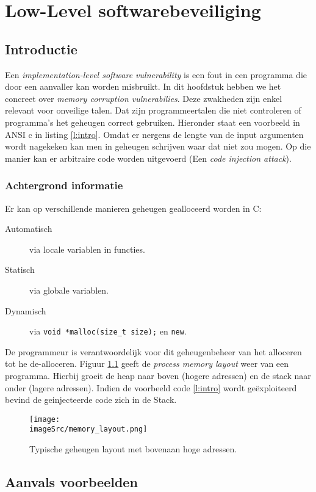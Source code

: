 \documentclass[../main.tex]{subfiles}
\begin{document}
\chapter{Low-Level softwarebeveiliging}
\section{Introductie}
Een \emph{implementation-level software vulnerability} is een fout in een programma die door een aanvaller kan worden misbruikt.
In dit hoofdstuk hebben we het concreet over \emph{memory corruption vulnerabilies}.
Deze zwakheden zijn enkel relevant voor onveilige talen.
Dat zijn programmeertalen die niet controleren of programma's het geheugen correct gebruiken.
Hieronder staat een voorbeeld in ANSI c in listing \ref{l:intro}. Omdat er nergens de lengte van de input argumenten wordt nagekeken kan men in geheugen schrijven waar dat niet zou mogen.
Op die manier kan er arbitraire code worden uitgevoerd (Een \emph{code injection attack}).
 


\subsection{Achtergrond informatie}
Er kan op verschillende manieren geheugen gealloceerd worden in C:
\begin{description}
	\item[Automatisch] via locale variablen in functies.	
	\item[Statisch] via globale variablen.	
	\item[Dynamisch] via \lstinline[style=cstyle]{void *malloc(size_t size);} en \lstinline[style=cstyle]{new}.
\end{description}
De programmeur is verantwoordelijk voor dit geheugenbeheer van het alloceren tot he de-alloceren.
Figuur \ref{f:mem_lay} geeft de \emph{process memory layout} weer van een programma.
Hierbij groeit de heap naar boven (hogere adressen) en de stack naar onder (lagere adressen).
Indien de voorbeeld code \ref{l:intro} wordt ge\"exploiteerd bevind de geinjecteerde code zich in de Stack.
\begin{figure}
\centering
\texttt{[image: \\imageSrc/memory\_layout.png]}
\caption{Typische geheugen layout met bovenaan hoge adressen.}
\label{f:mem_lay}
\end{figure}


\section{Aanvals voorbeelden}
\end{document}
